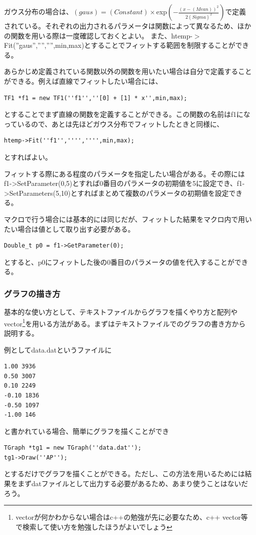 ガウス分布の場合は、$(gaus)=(Constant)\times$exp$(-\frac{(x-(Mean))^2}{2(Sigma)^2})$で定義されている。それぞれの出力されるパラメータは関数によって異なるため、ほかの関数を用いる際は一度確認しておくとよい。
また、htemp-$>$Fit(''gaus'','''','''',min,max)とすることでフィットする範囲を制限することができる。

あらかじめ定義されている関数以外の関数を用いたい場合は自分で定義することができる。例えば直線でフィットしたい場合には、
\begin{lstlisting}
TF1 *f1 = new TF1(''f1'',''[0] + [1] * x'',min,max);
 \end{lstlisting}
とすることでまず直線の関数を定義することができる。この関数の名前はf1になっているので、あとは先ほどガウス分布でフィットしたときと同様に、
\begin{lstlisting}
htemp->Fit(''f1'','''','''',min,max);
 \end{lstlisting}
とすればよい。

フィットする際にある程度のパラメータを指定したい場合がある。その際にはf1->SetParameter(0,5)とすれば0番目のパラメータの初期値を5に設定でき、f1->SetParameters(5,10)とすればまとめて複数のパラメータの初期値を設定できる。

マクロで行う場合には基本的には同じだが、フィットした結果をマクロ内で用いたい場合は値として取り出す必要がある。
\begin{lstlisting}
Double_t p0 = f1->GetParameter(0);
 \end{lstlisting}
とすると、p0にフィットした後の0番目のパラメータの値を代入することができる。

\subsubsection{グラフの描き方}
基本的な使い方として、テキストファイルからグラフを描くやり方と配列やvector\footnote{vectorが何かわからない場合はc++の勉強が先に必要なため、c++ vector等で検索して使い方を勉強したほうがよいでしょう}を用いる方法がある。まずはテキストファイルでのグラフの書き方から説明する。

例としてdata.datというファイルに
\begin{lstlisting}
1.00 3936
0.50 3007
0.10 2249
-0.10 1836
-0.50 1097
-1.00 146
 \end{lstlisting}
と書かれている場合、簡単にグラフを描くことができ
\begin{lstlisting}
TGraph *tg1 = new TGraph(''data.dat'');
tg1->Draw(''AP'');
 \end{lstlisting}
とするだけでグラフを描くことができる。ただし、この方法を用いるためには結果をまずdatファイルとして出力する必要があるため、あまり使うことはないだろう。

